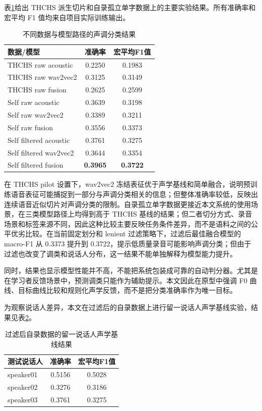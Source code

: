 \documentclass[UTF8,a4paper,twocolumn]{ctexart}
\begin{document}
表\ref{tab:main-results}给出 THCHS 派生切片和自录孤立单字数据上的主要实验结果。所有准确率和宏平均 F1 值均来自项目实际训练输出。

\begin{table}[t]
\centering
\caption{不同数据与模型路径的声调分类结果}
\label{tab:main-results}
\begin{tabular}{lcc}
\toprule
数据/模型 & 准确率 & 宏平均F1值 \\
\midrule
THCHS raw acoustic & 0.2250 & 0.1983 \\
THCHS raw wav2vec2 & 0.3125 & 0.3149 \\
THCHS raw fusion & 0.2625 & 0.2599 \\
\midrule
Self raw acoustic & 0.3639 & 0.3198 \\
Self raw wav2vec2 & 0.3389 & 0.3211 \\
Self raw fusion & 0.3556 & 0.3373 \\
\midrule
Self filtered acoustic & 0.3761 & 0.3275 \\
Self filtered wav2vec2 & 0.3644 & 0.3354 \\
Self filtered fusion & \textbf{0.3965} & \textbf{0.3722} \\
\bottomrule
\end{tabular}
\end{table}

在 THCHS pilot 设置下，wav2vec2 冻结表征优于声学基线和简单融合，说明预训练语音表征可能捕捉到一部分与声调分类相关的信息；但整体准确率较低，反映出连续语音近似切片对声调分类的限制。自录孤立单字数据更接近本文系统的使用场景，在三类模型路径上均得到高于 THCHS 基线的结果；但二者切分方式、录音场景和标签来源不同，因此这种比较主要反映任务条件差异，而不是语料之间的公平优劣比较。在当前固定划分和 lenient 过滤策略下，过滤后最佳融合模型的 macro-F1 从 0.3373 提升到 0.3722，提示低质量录音可能影响声调分类；但由于过滤也改变了调类和说话人分布，这一结果不能单独解释为模型能力提升。

同时，结果也显示模型性能并不高，不能把系统包装成可靠的自动判分器。尤其是在学习者反馈场景中，预测调类只能作为辅助提示。本文因此在原型中强调 F0 曲线、目标曲线比较和规则化声学反馈，而不是把分类准确率作为唯一目标。

为观察说话人差异，本文在过滤后的自录数据上进行留一说话人声学基线实验，结果见表\ref{tab:loso}。

\begin{table}[t]
\centering
\caption{过滤后自录数据的留一说话人声学基线结果}
\label{tab:loso}
\begin{tabular}{lcc}
\toprule
测试说话人 & 准确率 & 宏平均F1值 \\
\midrule
speaker01 & 0.5156 & 0.5028 \\
speaker02 & 0.3276 & 0.3186 \\
speaker03 & 0.3761 & 0.3275 \\
\bottomrule
\end{tabular}
\end{table}
\end{document}
